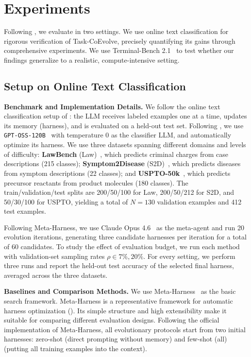\documentclass{article} %
\begin{document}
\section{Experiments}
\label{sec:experiments}

Following \citet{lee2026meta}, we evaluate in two settings. We use online text classification for rigorous verification of Task-CoEvolve, precisely quantifying its gains through comprehensive experiments. We use Terminal-Bench 2.1~\citep{merrill2026terminal} to test whether our findings generalize to a realistic, compute-intensive setting.


\subsection{Setup on Online Text Classification}
\textbf{Benchmark and Implementation Details.}
We follow the online text classification setup of \citet{zhang2025ace,ye2026meta,lee2026meta}: the LLM receives labeled examples one at a time, updates its memory (harness), and is evaluated on a held-out test set. Following \citet{lee2026meta}, we use \texttt{GPT-OSS-120B}~\citep{agarwal2025gpt} with temperature $0$ as the classifier LLM, and automatically optimize its harness. We use three datasets spanning different domains and levels of difficulty:
\textbf{LawBench} (Law)~\citep{fei2024lawbench}, which predicts criminal charges from case descriptions (215 classes);
\textbf{Symptom2Disease} (S2D)~\citep{gretel2023symptom}, which predicts diseases from symptom descriptions (22 classes); and
\textbf{USPTO-50k}~\citep{schneider2016s}, which predicts precursor reactants from product molecules (180 classes).
The train/validation/test splits are 200/50/100 for Law, 200/50/212 for S2D, and 50/30/100 for USPTO, yielding a total of $N=130$ validation examples and 412 test examples.

Following Meta-Harness, we use Claude Opus 4.6~\citep{anthropic2026claudeopus46} as the meta-agent and run 20 evolution iterations, generating three candidate harnesses per iteration for a total of 60 candidates.
To study the effect of evaluation budget, we run each method with validation-set sampling rates $\rho \in {7\%, 20\%}$. For every setting, we perform three runs and report the held-out test accuracy of the selected final harness, averaged across the three datasets.


\textbf{Baselines and Comparison Methods.}
We use Meta-Harness~\citep{lee2026meta} as the basic search framework. Meta-Harness is a representative framework for automatic harness optimization (). Its simple structure and high extensibility make it suitable for comparing different evaluation designs. Following the official implementation of Meta-Harness, all evolutionary protocols start from two initial harnesses: zero-shot (direct prompting without memory) and few-shot (all) (putting all training examples into the context).
\end{document}

